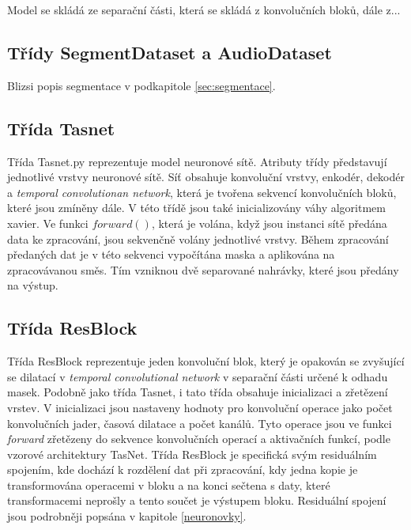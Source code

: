 Model se skládá ze separační části, která se skládá z konvolučních bloků, dále z...



\subsection*{Třídy SegmentDataset a AudioDataset}
Blizsi popis segmentace v podkapitole \ref{sec:segmentace}.


\subsection*{Třída Tasnet}
Třída Tasnet.py reprezentuje model neuronové sítě. Atributy třídy představují jednotlivé vrstvy neuronové sítě. Síť obsahuje konvoluční vrstvy, enkodér, dekodér a \textit{temporal convolutionan network}, která je tvořena sekvencí konvolučních bloků, které jsou zmíněny dále. V této třídě jsou také inicializovány váhy algoritmem xavier. Ve funkci $forward()$, která je volána, když jsou instanci sítě předána data ke zpracování, jsou sekvenčně volány jednotlivé vrstvy. Během zpracování předaných dat je v této sekvenci vypočítána maska a aplikována na zpracovávanou směs. Tím vzniknou dvě separované nahrávky, které jsou předány na výstup. 


\subsection*{Třída ResBlock}
Třída ResBlock reprezentuje jeden konvoluční blok, který je opakován se zvyšující se dilatací v \textit{temporal convolutional network} v separační části určené k odhadu masek. Podobně jako třída Tasnet, i tato třída obsahuje inicializaci a zřetězení vrstev. V inicializaci jsou nastaveny hodnoty pro konvoluční operace jako počet konvolučních jader, časová dilatace a počet kanálů. Tyto operace jsou ve funkci \textit{forward} zřetězeny do sekvence konvolučních operací a aktivačních funkcí, podle vzorové architektury TasNet. Třída ResBlock je specifická svým residuálním spojením, kde dochází k rozdělení dat při zpracování, kdy jedna kopie je transformována operacemi v bloku a na konci sečtena s daty, které transformacemi neprošly a tento součet je výstupem bloku. Residuální spojení jsou podrobněji popsána v kapitole \ref{neuronovky}.

